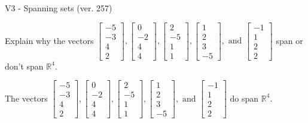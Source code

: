 \begin{exercise}
  \begin{exerciseTitle}V3 - Spanning sets (ver. 257)\end{exerciseTitle}
  \begin{exerciseStatement}
    Explain why the vectors \(\left[\begin{array}{r}
-5 \\
-3 \\
4 \\
2
\end{array}\right] , \left[\begin{array}{r}
0 \\
-2 \\
4 \\
4
\end{array}\right] , \left[\begin{array}{r}
2 \\
-5 \\
1 \\
1
\end{array}\right] , \left[\begin{array}{r}
1 \\
2 \\
3 \\
-5
\end{array}\right] , \text{ and } \left[\begin{array}{r}
-1 \\
1 \\
2 \\
2
\end{array}\right]\) span or don't span \(\mathbb{R}^4\). 
	


  \end{exerciseStatement}
  \begin{exerciseAnswer}
   The vectors \(\left[\begin{array}{r}
-5 \\
-3 \\
4 \\
2
\end{array}\right] , \left[\begin{array}{r}
0 \\
-2 \\
4 \\
4
\end{array}\right] , \left[\begin{array}{r}
2 \\
-5 \\
1 \\
1
\end{array}\right] , \left[\begin{array}{r}
1 \\
2 \\
3 \\
-5
\end{array}\right] , \text{ and } \left[\begin{array}{r}
-1 \\
1 \\
2 \\
2
\end{array}\right]\) 
  	 do  
	span \(\mathbb{R}^4\).
  


  \end{exerciseAnswer}
\end{exercise}